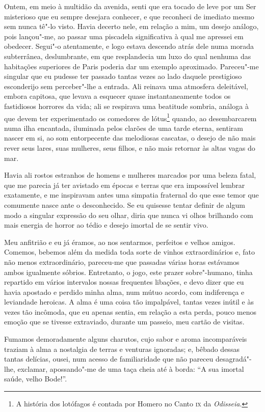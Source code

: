 Ontem, em meio à multidão da avenida, senti que era tocado de leve por
um Ser misterioso que eu sempre desejara conhecer, e que reconheci de
imediato mesmo sem nunca tê"-lo visto. Havia decerto nele, em
relação a mim, um desejo análogo, pois lançou"-me, ao passar uma
piscadela significativa à qual me apressei em obedecer. Segui"-o
atentamente, e logo estava descendo atrás dele numa morada subterrânea,
deslumbrante, em que resplandecia um luxo do qual nenhuma das
habitações superiores de Paris poderia dar um exemplo aproximado.
Pareceu"-me singular que eu pudesse ter passado tantas vezes ao lado
daquele prestigioso esconderijo sem perceber"-lhe a entrada. Ali
reinava uma atmosfera deleitável, embora capitosa, que levava a
esquecer quase instantaneamente todos os fastidiosos horrores da
vida; ali se respirava uma beatitude sombria, análoga à que devem ter
experimentado os comedores de lótus\protect\footnote{  A história 
dos lotófagos é contada por Homero no Canto \textsc{ix} da
\textit{Odisseia}.} quando, ao
desembarcarem numa ilha encantada, iluminada pelos clarões de uma tarde
eterna, sentiram nascer em si, ao som entorpecente das melodiosas
cascatas, o desejo de não mais rever seus lares, suas mulheres, seus
filhos, e não mais retornar às altas vagas do mar.

Havia ali rostos estranhos de homens e mulheres marcados por uma beleza
fatal, que me parecia já ter avistado em épocas e terras que era
impossível lembrar exatamente, e me inspiravam antes uma simpatia
fraternal do que esse temor que comumente nasce ante o
desconhecido. Se eu quisesse tentar definir de algum modo a
singular expressão do seu olhar, diria que nunca vi olhos
brilhando com mais energia de horror ao tédio e desejo imortal de
se sentir vivo.

Meu anfitrião e eu já éramos, ao nos sentarmos, perfeitos e velhos 
amigos. Comemos, bebemos além da medida toda sorte de vinhos
extraordinários e, fato não menos extraordinário, pareceu-me que passadas várias horas estávamos ambos igualmente sóbrios. Entretanto,
o jogo, este prazer sobre"-humano, tinha repartido em vários
intervalos nossas frequentes libações, e devo dizer que eu havia
apostado e perdido minha alma, num mútuo acordo, com indiferença e
leviandade heroicas. A alma é uma coisa tão impalpável, tantas vezes
inútil e às vezes tão incômoda, que eu apenas sentia, em relação a esta
perda, pouco menos emoção que se tivesse extraviado, durante um
passeio, meu cartão de visitas.

Fumamos demoradamente alguns charutos, cujo sabor e aroma incomparáveis
traziam à alma a nostalgia de terras e venturas ignoradas; e,
bêbado dessas tantas delícias, ousei, num acesso de familiaridade que
não pareceu desagradá"-lhe, exclamar, apossando"-me de uma taça cheia
até à borda: “A sua imortal saúde, velho
Bode!''.

